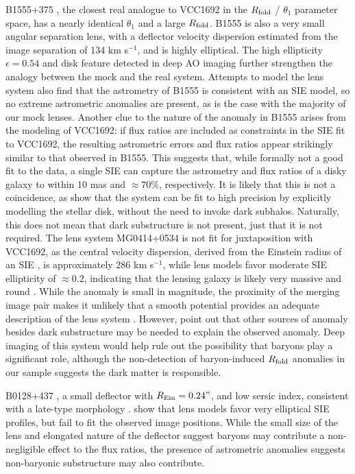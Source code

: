 \begin{itemize}
	B1555+375 \cite{Mar+99}, the closest real analogue to VCC1692 in the $R_{\rm{fold}}$ / $\theta_1$ parameter space, has a nearly identical $\theta_1$ and a large $R_{\rm{fold}}$. B1555 is also a very small angular separation lens, with a deflector velocity dispersion estimated from the image separation of 134 km s$^{-1}$, and is highly elliptical. The high ellipticity $\epsilon = 0.54$ and disk feature detected in deep AO imaging \cite{HsuehEtal16} further strengthen the analogy between the mock and the real system. Attempts to model the lens system \cite{Mar+99,MirandaJetzer07} also find that the astrometry of B1555 is consistent with an SIE model, so no extreme astrometric anomalies are present, as is the case with the majority of our mock lenses. Another clue to the nature of the anomaly in B1555 arises from the modeling of VCC1692: if flux ratios are included as constraints in the SIE fit to VCC1692, the resulting astrometric errors and flux ratios appear strikingly similar to that observed in B1555. This suggests that, while formally not a good fit to the data, a single SIE can capture the astrometry and flux ratios of a disky galaxy to within 10 mas and $\approx 70 \%$, respectively. It is likely that this is not a coincidence, as \cite{HsuehEtal16} show that the system can be fit to high precision by explicitly modelling the stellar disk, without the need to invoke dark subhalos. Naturally, this does not mean that dark substructure is not present, just that it is not required.
	\newline \indent The lens system MG0414+0534 is not fit for juxtaposition with VCC1692, as the central velocity dispersion, derived from the Einstein radius of an SIE \cite{Xuetal2015}, is approximately 286 km s$^{-1}$, while lens models favor moderate SIE ellipticity of $\approx 0.2$, indicating that the lensing galaxy is likely very massive and round \cite{Hewitt++92}. While the anomaly is small in magnitude, the proximity of the merging image pair makes it unlikely that a smooth potential provides an adequate description of the lens system \cite{Minezaki++09,Keeton:2005p591,Xuetal2015}. However, \cite{Xuetal2015} point out that other sources of anomaly besides dark substructure may be needed to explain the observed anomaly. Deep imaging of this system would help rule out the possibility that baryons play a significant role, although the non-detection of baryon-induced $R_{\rm{fold}}$ anomalies in our sample suggests the dark matter is responsible. 
	
	B0128+437 \cite{Phillips++00}, a small deflector with $R_{\rm{Ein}}=0.24"$, and low sersic index, consistent with a late-type morphology \cite{LAF10}. \cite{BiggsEtal04} show that lens models favor very elliptical SIE profiles, but fail to fit the observed image positions. While the small size of the lens and elongated nature of the deflector suggest baryons may contribute a non-negligible effect to the flux ratios, the presence of astrometric anomalies suggests non-baryonic substructure may also contribute.
	

\end{itemize}
